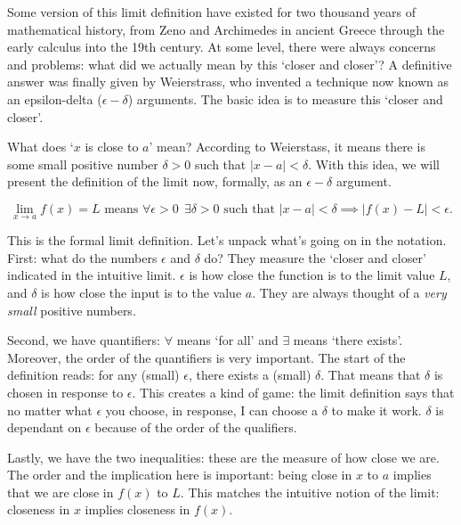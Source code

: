 \documentclass[fleqn]{report}
\begin{document}
Some version of this limit definition have existed for two thousand
years of mathematical history, from Zeno and Archimedes in
ancient Greece through the early calculus into the 19th
century. At some level, there were always concerns and
problems: what did we actually mean by this `closer and
closer'? A definitive answer was finally given by
Weierstrass, who invented a technique now known as an
epsilon-delta ($\epsilon-\delta$) arguments. The basic idea is
to measure this `closer and closer'. 

What does `$x$ is close to $a$' mean? According to Weierstass,
it means there is some small positive number $\delta > 0$ such
that $|x-a| < \delta$. With this idea, we will present the
definition of the limit now, formally, as an $\epsilon-\delta$
argument.

\begin{defn}
\begin{equation*}
\lim_{x \rightarrow a} f(x) = L \text{ means } 
\forall \epsilon > 0 \ \ \exists \delta > 0 \text{ such that }
|x-a| < \delta \implies |f(x) - L| < \epsilon.
\end{equation*}
\end{defn}

This is the formal limit definition. Let's unpack what's
going on in the notation. First: what do the numbers
$\epsilon$ and $\delta$ do? They measure the `closer and
closer' indicated in the intuitive limit. $\epsilon$ is how
close the function is to the limit value $L$, and $\delta$ is
how close the input is to the value $a$. They are always
thought of a \emph{very small} positive numbers.

Second, we have quantifiers: $\forall$ means `for all' and
$\exists$ means `there exists'. Moreover, the order of the
quantifiers is very important. The start of the definition
reads: for any (small) $\epsilon$, there exists a (small)
$\delta$. That means that $\delta$ is chosen in response to
$\epsilon$. This creates a kind of game: the limit definition
says that no matter what $\epsilon$ you choose, in response, I
can choose a $\delta$ to make it work. $\delta$ is dependant
on $\epsilon$ because of the order of the qualifiers.

Lastly, we have the two inequalities: these are the measure of
how close we are. The order and the implication here is
important: being close in $x$ to $a$ implies that we are close
in $f(x)$ to $L$. This matches the intuitive notion of the
limit: closeness in $x$ implies closeness in $f(x)$.
\end{document}
